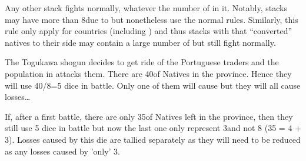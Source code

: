 Any other stack fights normally, whatever the number of \LD in it. Notably,
\TUR stacks may have more than 8\LD due to \Pashas but nonetheless use the
normal rules. Similarly, this rule only apply for \ROTW countries (including
) and thus stacks with \LeaderC that ``converted'' natives to
their side may contain a large number of \LD but still fight normally.

\begin{exemple}
  The Togukawa shogun decides to get ride of the Portuguese traders and the
  population in  attacks them. There are 40\LD of Natives in
  the province. Hence they will use 40/8=5 dice in battle. Only one of them
  will cause \textetoile but they will all cause losses\ldots

  If, after a first battle, there are only 35\LD of Natives left in the
  province, then they still use 5 dice in battle but now the last one only
  represent 3\LD and not 8 (35 = 4  + 3). Losses caused by this
  die are tallied separately as they will need to be reduced as any losses
  caused by 'only' 3\LD.
\end{exemple}

